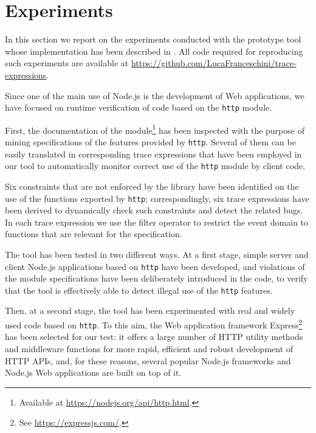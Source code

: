 \section{Experiments}
\label{sec:exps}

In this section we report on the experiments conducted with the prototype tool
whose implementation has been described in . All code required for reproducing such experiments are available
at \url{https://github.com/LucaFranceschini/trace-expressions}. %

Since one of the main use of Node.js is the development of Web applications,
we have focused on runtime verification of code based on the \lstinline{http} module.

First, the documentation of the module\footnote{Available at \url{https://nodejs.org/api/http.html}.} has been inspected  
with the purpose of mining specifications of the features provided by \lstinline{http}.
Several of them can be easily translated in corresponding trace expressions
that have been employed in our tool to automatically monitor correct use of the \lstinline{http}
module by client code.

Six constraints that are not enforced by the library have been identified on the use of the functions exported by \lstinline{http};
correspondingly, six trace expressions have been derived to
dynamically check such constraints and detect the related bugs.
In each trace expression we use the filter operator to restrict the event domain to functions that are relevant for the specification.

The tool has been tested in two different ways.
At a first stage, simple server and client Node.js applications based on \lstinline{http} have been developed,
and violations of the module specifications have been deliberately introduced in the code,
to verify that the tool is effectively able to detect illegal use of the \lstinline{http} features.

Then, at a second stage, the tool has been experimented with real and widely used code based on  \lstinline{http}.
To this aim, the Web application framework Express\footnote{See \url{https://expressjs.com/}.} has been
selected for our test: it offers a large number of HTTP utility methods and middleware functions for more rapid, efficient
and robust development of HTTP APIs, and, for these reasons, several popular Node.js frameworks and Node.js Web applications
are built on top of it. 

